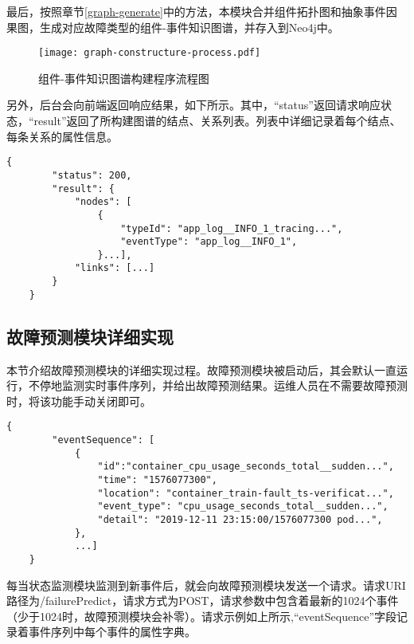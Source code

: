 最后，按照章节\ref{graph-generate}中的方法，本模块合并组件拓扑图和抽象事件因果图，生成对应故障类型的组件-事件知识图谱，并存入到Neo4j中。
\newpage
\begin{figure}[htbp]
    \centering
    \texttt{[image: graph-constructure-process.pdf]}
    \caption{组件-事件知识图谱构建程序流程图\label{graph-constructure-process}}
\end{figure}


另外，后台会向前端返回响应结果，如下所示。其中，“status”返回请求响应状态，“result”返回了所构建图谱的结点、关系列表。列表中详细记录着每个结点、每条关系的属性信息。
\begin{lstlisting}[xleftmargin=8em]
    {
        "status": 200,
        "result": {
            "nodes": [ 
                {
                    "typeId": "app_log__INFO_1_tracing...",
                    "eventType": "app_log__INFO_1",
                }...],
            "links": [...]
        }
    }
\end{lstlisting}

\subsection{故障预测模块详细实现}
本节介绍故障预测模块的详细实现过程。故障预测模块被启动后，其会默认一直运行，不停地监测实时事件序列，并给出故障预测结果。运维人员在不需要故障预测时，将该功能手动关闭即可。

\begin{lstlisting}[xleftmargin=2em]
    {
        "eventSequence": [
            {
                "id":"container_cpu_usage_seconds_total__sudden...",
                "time": "1576077300",
                "location": "container_train-fault_ts-verificat...",
                "event_type": "cpu_usage_seconds_total__sudden...",
                "detail": "2019-12-11 23:15:00/1576077300 pod...",
            }, 
            ...]
    }
\end{lstlisting}

每当状态监测模块监测到新事件后，就会向故障预测模块发送一个请求。请求URI路径为/failurePredict，请求方式为POST，请求参数中包含着最新的1024个事件（少于1024时，故障预测模块会补零）。请求示例如上所示,“eventSequence”字段记录着事件序列中每个事件的属性字典。

